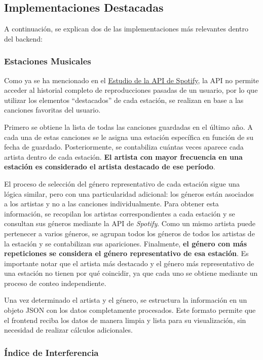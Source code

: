 \subsection{Implementaciones Destacadas}
A continuación, se explican dos de las implementaciones más relevantes dentro del backend:

\subsubsection*{Estaciones Musicales}

Como ya se ha mencionado en el \hyperref[sec:estudio_api_tracks]{Estudio de la API de Spotify}, la API no permite acceder al historial completo de reproducciones pasadas de un usuario, por lo que utilizar los elementos ``destacados'' de cada estación, se realizan en base a las canciones favoritas del usuario.

Primero se obtiene la lista de todas las canciones guardadas en el último año. A cada una de estas canciones se le asigna una estación específica en función de su fecha de guardado. Posteriormente, se contabiliza cuántas veces aparece cada artista dentro de cada estación. \textbf{El artista con mayor frecuencia en una estación es considerado el artista destacado de ese período}.

El proceso de selección del género representativo de cada estación sigue una lógica similar, pero con una particularidad adicional: los géneros están asociados a los artistas y no a las canciones individualmente. Para obtener esta información, se recopilan los artistas correspondientes a cada estación y se consultan sus géneros mediante la API de \textit{Spotify}. Como un mismo artista puede pertenecer a varios géneros, se agrupan todos los géneros de todos los artistas de la estación y se contabilizan sus apariciones. Finalmente, \textbf{el género con más repeticiones se considera el género representativo de esa estación}. Es importante notar que el artista más destacado y el género más representativo de una estación no tienen por qué coincidir, ya que cada uno se obtiene mediante un proceso de conteo independiente.

Una vez determinado el artista y el género, se estructura la información en un objeto JSON con los datos completamente procesados. Este formato permite que el frontend reciba los datos de manera limpia y lista para su visualización, sin necesidad de realizar cálculos adicionales.

\newpage

\subsubsection*{Índice de Interferencia}

